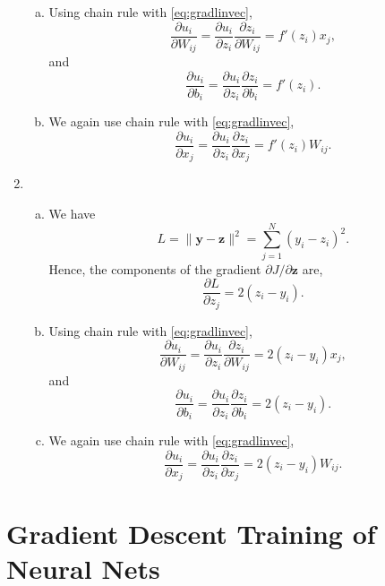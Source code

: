 \documentclass[11pt]{article}
\newcommand{\ybf}{\mathbf{y}}
\newcommand{\zbf}{\mathbf{z}}
\begin{document}
\begin{enumerate}
\begin{enumerate}[(a)]
\item Using chain rule with \eqref{eq:gradlinvec},
\[
    \frac{\partial u_i}{\partial W_{ij}} = \frac{\partial u_i}{\partial z_i}\frac{\partial z_i}{\partial W_{ij}} = f'(z_i)x_j,
\]
and
\[
    \frac{\partial u_i}{\partial b_i} = \frac{\partial u_i}{\partial z_i}\frac{\partial z_i}{\partial b_i} = f'(z_i).
\]


\item We again use chain rule with \eqref{eq:gradlinvec},
\[
    \frac{\partial u_i}{\partial x_j} = \frac{\partial u_i}{\partial z_i}\frac{\partial z_i}{\partial x_j} = f'(z_i)W_{ij}.
\]
\end{enumerate}

\item
\begin{enumerate}[(a)]
\item We have
\[
    L = \|\ybf-\zbf\|^2 = \sum_{j=1}^N (y_i-z_i)^2.
\]
Hence, the components of the gradient $\partial J/\partial \zbf$ are,
\[
    \frac{\partial L}{\partial z_j} = 2(z_i-y_i).
\]

\item Using chain rule with \eqref{eq:gradlinvec},
\[
    \frac{\partial u_i}{\partial W_{ij}} = \frac{\partial u_i}{\partial z_i}\frac{\partial z_i}{\partial W_{ij}} = 2(z_i-y_i)x_j,
\]
and
\[
    \frac{\partial u_i}{\partial b_i} = \frac{\partial u_i}{\partial z_i}\frac{\partial z_i}{\partial b_i} = 2(z_i-y_i).
\]


\item We again use chain rule with \eqref{eq:gradlinvec},
\[
    \frac{\partial u_i}{\partial x_j} = \frac{\partial u_i}{\partial z_i}\frac{\partial z_i}{\partial x_j} = 2(z_i-y_i)W_{ij}.
\]
\end{enumerate}
\end{enumerate}

\section{Gradient Descent Training of Neural Nets}
\end{document}
